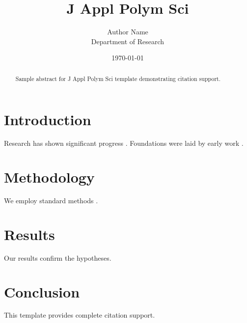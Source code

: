 \documentclass{wiley-nj}
\title{J Appl Polym Sci}
\author{Author Name \\ \small Department of Research}
\date{\today}
\begin{document}
\maketitle

\begin{abstract}
Sample abstract for J Appl Polym Sci template demonstrating citation support.
\end{abstract}

\section{Introduction}
Research has shown significant progress \citep{einstein1905}. Foundations were laid by early work \citep{turing1950}.

\section{Methodology}
We employ standard methods \citep{knuth1984}.

\section{Results}
Our results confirm the hypotheses.

\section{Conclusion}
This template provides complete citation support.



\end{document}
